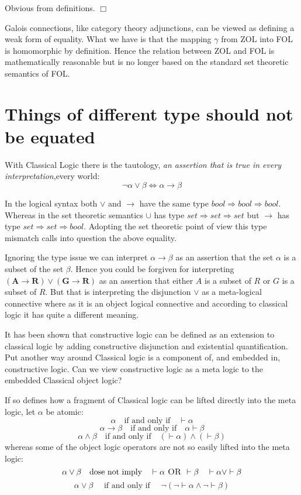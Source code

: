 Obvious from definitions. \hspace{\fill} $\Box$



Galois connections, like category theory  adjunctions, can be viewed as defining a weak form of equality.  What we have is that the mapping $\gamma$ from ZOL into FOL is homomorphic by definition. Hence the relation between ZOL and FOL is mathematically reasonable but is no longer based on
  the standard set theoretic semantics of FOL. 

 \section{Things of different type should not be equated }
With Classical Logic there is the tautology, \emph{an assertion that is true in every interpretation},every world:
\[ \neg \alpha \vee \beta \Leftrightarrow \alpha \rightarrow \beta \] 

In the logical syntax both $\vee$ and $\rightarrow$ have the same type $bool\Rightarrow bool\Rightarrow bool$. Whereas in the set theoretic semantics $\cup$ has type $set\Rightarrow set\Rightarrow set$ but $\rightarrow$ has type $set\Rightarrow set\Rightarrow bool$. Adopting the set theoretic point of view this type mismatch calls into question the above equality. 

 Ignoring the type issue we can interpret $\alpha \rightarrow \beta$ as an assertion that the set $\alpha$ is a subset of the set $\beta$. Hence you could be forgiven for  interpreting 
$ \mathbf{(A\rightarrow R)\vee (G\rightarrow R)}$ as an assertion that either $A$ is a subset of $R$ or $G$ is a subset of $R$.  But that is interpreting the disjunction $\vee$ as a meta-logical connective where as it is an object logical connective
and according to classical logic it has quite a different meaning. 


It has been shown \cite{ConstructClassical} that constructive logic can be defined as an extension to classical logic by adding  constructive disjunction and existential quantification.
Put another way around Classical logic is a component of, and embedded in, constructive logic. {\color{red} Can we view constructive logic as a meta logic to the embedded Classical object logic?} 




If so \cite{ConstructClassical} defines how a fragment of Classical logic can be lifted directly into the meta logic, let $\alpha$ be atomic:
\[ \alpha   \quad \text{if and only if} \quad \vdash \alpha \]
\[ \alpha  \rightarrow \beta \quad \text{if and only if} \quad \alpha \vdash \beta \]
\[ \alpha  \wedge \beta \quad \text{if and only if} \quad (\vdash \alpha) \wedge (\vdash \beta) \]
whereas some of the object logic operators are not so easily lifted into the meta logic:
\[ \alpha \vee  \beta \quad \text{dose not imply} \quad  \vdash \alpha \textsc{ OR } \vdash \beta \quad  \vdash \alpha \vee \vdash \beta\]
\[ \alpha \vee  \beta \quad \text{ if and only if } \quad \neg (\neg \vdash \alpha \wedge \neg \vdash \beta ) \]

